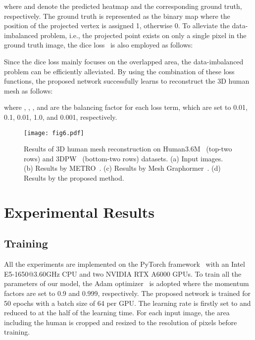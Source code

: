 \documentclass[10pt,twocolumn,letterpaper]{article}
\begin{document}
where  and  denote the predicted heatmap and the corresponding ground truth, respectively. The ground truth is represented as the binary map where the position of the projected vertex is assigned 1, otherwise 0.
To alleviate the data-imbalanced problem, i.e., the projected point exists on only a single pixel in the ground truth image, the dice loss~\cite{Milletari16} is also employed as follows:

Since the dice loss mainly focuses on the overlapped area, the data-imbalanced problem can be efficiently alleviated. 
By using the combination of these loss functions, the proposed network successfully learns to reconstruct the 3D human mesh as follows: 

where , , ,  and  are the balancing factor for each loss term, which are set to 0.01, 0.1, 0.01, 1.0, and 0.001, respectively.

\begin{figure*}[t]
\vspace{-4mm}
\centerline{\texttt{[image: fig6.pdf]}}
\caption{\label{fig:comparison}
Results of 3D human mesh reconstruction on Human3.6M~\cite{Ionescu13} (top-two rows) and 3DPW~\cite{Von2018} (bottom-two rows) datasets. (a) Input images. (b) Results by METRO~\cite{Lin21}. (c) Results by Mesh Graphormer~\cite{Lin21_ICCV}. (d) Results by the proposed method.}
\end{figure*}




\section{Experimental Results}
\subsection{Training}
All the experiments are implemented on the PyTorch framework~\cite{Paszke17} with an Intel E5-1650@3.60GHz CPU and two NVIDIA RTX A6000 GPUs. To train all the parameters of our model, the Adam optimizer~\cite{Kingma2015} is adopted where the momentum factors are set to 0.9 and 0.999, respectively. The proposed network is trained for 50 epochs with a batch size of 64 per GPU. The learning rate is firstly set to  and reduced to  at the half of the learning time. For each input image, the area including the human is cropped and resized to the resolution of  pixels before training.
\end{document}
